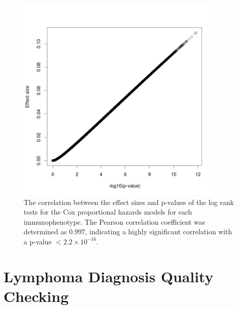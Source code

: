 \begin{figure}[!ht]
  \begin{center}
    \includegraphics[width=10cm]{figs/rchy/figs/cor}
  \end{center}
  \caption{The correlation between the effect sizes and p-values of the log rank tests for the Cox proportional hazards models for each immunophenotype. The Pearson correlation coefficient was determined as $0.997$, indicating a highly significant correlation with a p-value  $< 2.2 \times 10^{-16}$.}
  \label{r1:effectsizevspv}
\end{figure}


\section{Lymphoma Diagnosis Quality Checking}
